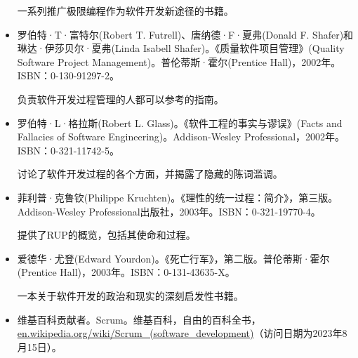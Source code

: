\begin{itemize}
\hspace*{\fill}

一系列推广极限编程作为软件开发新途径的书籍。

\hspace*{\fill}

\item
罗伯特·T·富特尔(Robert T. Futrell)、唐纳德·F·夏弗(Donald F. Shafer)和琳达·伊莎贝尔·夏弗(Linda Isabell Shafer)。《质量软件项目管理》(Quality Software Project Management)。普伦蒂斯·霍尔(Prentice Hall)，2002年。ISBN：0-130-91297-2。

\hspace*{\fill}

负责软件开发过程管理的人都可以参考的指南。

\hspace*{\fill}

\item
罗伯特·L·格拉斯(Robert L. Glass)。《软件工程的事实与谬误》(Facts and Fallacies of Software Engineering)。Addison-Wesley Professional，2002年。ISBN：0-321-11742-5。

\hspace*{\fill}

讨论了软件开发过程的各个方面，并揭露了隐藏的陈词滥调。

\hspace*{\fill}

\item
菲利普·克鲁钦(Philippe Kruchten)。《理性的统一过程：简介》，第三版。Addison-Wesley Professional出版社，2003年。ISBN：0-321-19770-4。

\hspace*{\fill}

提供了RUP的概览，包括其使命和过程。

\hspace*{\fill}

\item
爱德华·尤登(Edward Yourdon)。《死亡行军》，第二版。普伦蒂斯·霍尔(Prentice Hall)，2003年。ISBN：0-131-43635-X。

\hspace*{\fill}

一本关于软件开发的政治和现实的深刻启发性书籍。

\hspace*{\fill}

\item
维基百科贡献者。Scrum。维基百科，自由的百科全书，\url{en.wikipedia.org/wiki/Scrum_(software_development)}（访问日期为2023年8月15日）。


\end{itemize}
